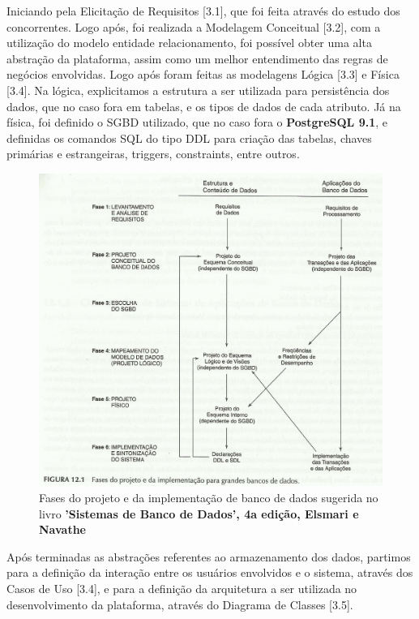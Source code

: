 \documentclass[graduacao,brazil]{ThesisPUC}
\begin{document}
Iniciando pela Elicita\c{c}\~{a}o de Requisitos [3.1], que foi feita atrav\'{e}s do estudo dos concorrentes.
Logo ap\'{o}s, foi realizada a Modelagem Conceitual [3.2], com a utiliza\c{c}\~{a}o do modelo entidade
relacionamento, foi poss\'{i}vel obter uma alta abstra\c{c}\~{a}o da plataforma, assim como um melhor
entendimento das regras de neg\'{o}cios envolvidas. Logo ap\'{o}s foram feitas as modelagens L\'{o}gica
[3.3] e F\'{i}sica [3.4]. Na l\'{o}gica, explicitamos a estrutura a ser utilizada para persist\^{e}ncia dos dados,
que no caso fora em tabelas, e os tipos de dados de cada atributo. J\'{a} na f\'{i}sica, foi definido o
SGBD utilizado, que no caso fora o \textbf{PostgreSQL 9.1}, e definidas os comandos SQL do tipo DDL
para criação das tabelas, chaves primárias e estrangeiras, triggers, constraints, entre outros.

\begin{figure}[H]
    \centering
    \includegraphics[width=\linewidth]{Imagens/fases_projeto_banco_dados.jpg}
    \caption{Fases do projeto e da implementação de banco de dados sugerida no livro 
	     \textbf{'Sistemas de Banco de Dados', 4a edição, Elsmari e Navathe}}
\end{figure}

Ap\'{o}s terminadas as abstra\c{c}\~{o}es referentes ao armazenamento dos dados, partimos para a
defini\c{c}\~{a}o da intera\c{c}\~{a}o entre os usu\'{a}rios envolvidos e o sistema, atrav\'{e}s dos Casos de Uso [3.4], e
para a defini\c{c}\~{a}o da arquitetura a ser utilizada no desenvolvimento da plataforma, atrav\'{e}s do
Diagrama de Classes [3.5].
\end{document}
